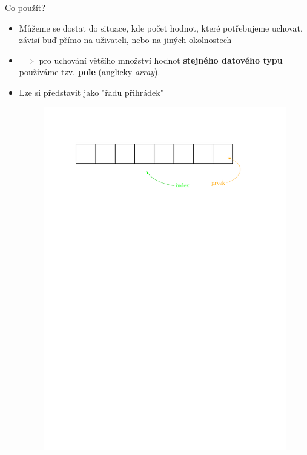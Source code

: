 \documentclass[14pt,aspectratio=169]{beamer}
\begin{document}
    \begin{frame}[t]{Co použít?}
        \begin{itemize}
            \item Můžeme se dostat do situace, kde počet hodnot, které potřebujeme uchovat, závisí buď přímo na uživateli, nebo na jiných okolnostech
            \item $\implies$ pro uchování většího množství hodnot \textbf{stejného datového typu} používáme tzv. \textbf{pole} (anglicky \emph{array}).
            \item Lze si představit jako "řadu přihrádek"
            \begin{figure}
                \includegraphics[scale=.8]{images/array1.pdf}
            \end{figure}
        \end{itemize}
    \end{frame}
\end{document}
